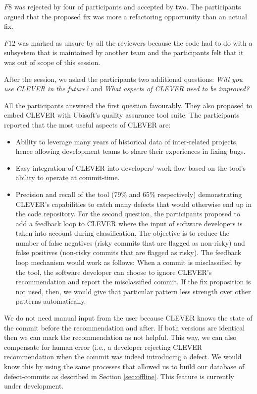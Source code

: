 \documentclass[sigconf]{acmart}
\providecommand{\tightlist}{%
  \setlength{\itemsep}{0pt}\setlength{\parskip}{0pt}}
\begin{document}
\(F8\) was rejected by four of participants and accepted by two. The
participants argued that the proposed fix was more a refactoring
opportunity than an actual fix.

\(F12\) was marked as unsure by all the reviewers because the code had
to do with a subsystem that is maintained by another team and the
participants felt that it was out of scope of this session.

After the session, we asked the participants two additional questions:
\emph{Will you use CLEVER in the future?} and \emph{What aspects of
CLEVER need to be improved?}

All the participants answered the first question favourably. They also
proposed to embed CLEVER with Ubisoft's quality assurance tool suite.
The participants reported that the most useful aspects of CLEVER are:

\begin{itemize}
\tightlist
\item
  Ability to leverage many years of historical data of inter-related
  projects, hence allowing development teams to share their experiences
  in fixing bugs.
\item
  Easy integration of CLEVER into developers' work flow based on the
  tool's ability to operate at commit-time.\\
\item
  Precision and recall of the tool (79\% and 65\% respectively)
  demonstrating CLEVER's capabilities to catch many defects that would
  otherwise end up in the code repository. For the second question, the
  participants proposed to add a feedback loop to CLEVER where the input
  of software developers is taken into account during classification.
  The objective is to reduce the number of false negatives (risky
  commits that are flagged as non-risky) and false positives (non-risky
  commits that are flagged as risky). The feedback loop mechanism would
  work as follows: When a commit is misclassified by the tool, the
  software developer can choose to ignore CLEVER's recommendation and
  report the misclassified commit. If the fix proposition is not used,
  then, we would give that particular pattern less strength over other
  patterns automatically.
\end{itemize}

We do not need manual input from the user because CLEVER knows the state
of the commit before the recommendation and after. If both versions are
identical then we can mark the recommendation as not helpful. This way,
we can also compensate for human error (i.e., a developer rejecting
CLEVER recommendation when the commit was indeed introducing a defect.
We would know this by using the same processes that allowed us to build
our database of defect-commits as described in Section
\ref{sec:offline}. This feature is currently under development.
\end{document}
